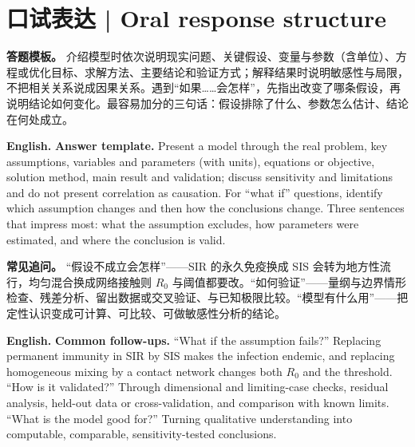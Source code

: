 \documentclass[UTF8,11pt,a4paper]{ctexart}
\newcommand{\EN}[1]{\par\noindent\textbf{English.} #1\par}
\begin{document}
\section*{口试表达 | Oral response structure}
\noindent\textbf{答题模板。} 介绍模型时依次说明现实问题、关键假设、变量与参数（含单位）、方程或优化目标、求解方法、主要结论和验证方式；解释结果时说明敏感性与局限，不把相关关系说成因果关系。遇到“如果……会怎样”，先指出改变了哪条假设，再说明结论如何变化。最容易加分的三句话：假设排除了什么、参数怎么估计、结论在何处成立。
\EN{\textbf{Answer template.} Present a model through the real problem, key assumptions, variables and parameters (with units), equations or objective, solution method, main result and validation; discuss sensitivity and limitations and do not present correlation as causation. For “what if” questions, identify which assumption changes and then how the conclusions change. Three sentences that impress most: what the assumption excludes, how parameters were estimated, and where the conclusion is valid.}
\noindent\textbf{常见追问。} “假设不成立会怎样”——SIR 的永久免疫换成 SIS 会转为地方性流行，均匀混合换成网络接触则 $R_0$ 与阈值都要改。“如何验证”——量纲与边界情形检查、残差分析、留出数据或交叉验证、与已知极限比较。“模型有什么用”——把定性认识变成可计算、可比较、可做敏感性分析的结论。
\EN{\textbf{Common follow-ups.} “What if the assumption fails?” Replacing permanent immunity in SIR by SIS makes the infection endemic, and replacing homogeneous mixing by a contact network changes both $R_0$ and the threshold. “How is it validated?” Through dimensional and limiting-case checks, residual analysis, held-out data or cross-validation, and comparison with known limits. “What is the model good for?” Turning qualitative understanding into computable, comparable, sensitivity-tested conclusions.}
\end{document}
